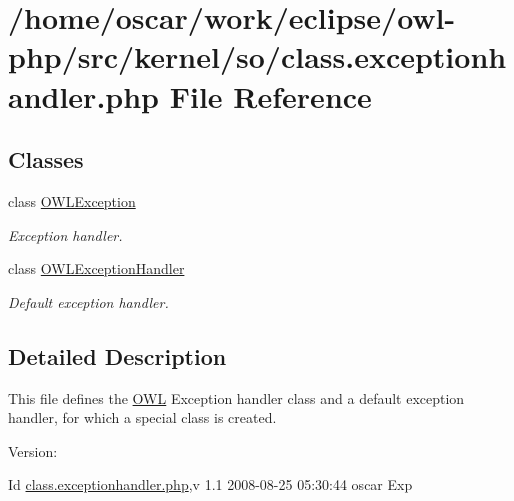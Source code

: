 \hypertarget{class_8exceptionhandler_8php}{
\section{/home/oscar/work/eclipse/owl-php/src/kernel/so/class.exceptionhandler.php File Reference}
\label{class_8exceptionhandler_8php}
}
\subsection*{Classes}
\begin{CompactItemize}
\item 
class \hyperlink{classOWLException}{OWLException}
\begin{CompactList}\small\item\em Exception handler. \item\end{CompactList}\item 
class \hyperlink{classOWLExceptionHandler}{OWLExceptionHandler}
\begin{CompactList}\small\item\em Default exception handler. \item\end{CompactList}\end{CompactItemize}


\subsection{Detailed Description}
This file defines the \hyperlink{classOWL}{OWL} Exception handler class and a default exception handler, for which a special class is created. \begin{Desc}
\item[Version:]\end{Desc}
\begin{Desc}
\item[Id]\hyperlink{class_8exceptionhandler_8php}{class.exceptionhandler.php},v 1.1 2008-08-25 05:30:44 oscar Exp \end{Desc}
